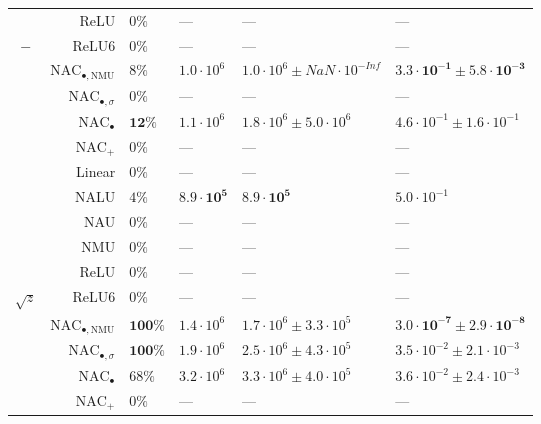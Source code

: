 \begin{longtable}{crllll}
 & ReLU & $0\%$ & --- & --- & ---\\

\multirow{-10}{*}{\centering\arraybackslash $\bm{-}$} & ReLU6 & $0\%$ & --- & --- & ---\\
\cmidrule{1-6}
 & $\mathrm{NAC}_{\bullet,\mathrm{NMU}}$ & $8\%$ & $1.0 \cdot 10^{6}$ & $1.0 \cdot 10^{6} \pm NaN \cdot 10^{-Inf}$ & $\mathbf{3.3 \cdot 10^{-1} \pm 5.8 \cdot 10^{-3}}$\\

 & $\mathrm{NAC}_{\bullet,\sigma}$ & $0\%$ & --- & --- & ---\\

 & $\mathrm{NAC}_{\bullet}$ & $\mathbf{12\%}$ & $1.1 \cdot 10^{6}$ & $1.8 \cdot 10^{6} \pm 5.0 \cdot 10^{6}$ & $4.6 \cdot 10^{-1} \pm 1.6 \cdot 10^{-1}$\\

 & $\mathrm{NAC}_{+}$ & $0\%$ & --- & --- & ---\\

 & Linear & $0\%$ & --- & --- & ---\\

 & NALU & $4\%$ & $\mathbf{8.9 \cdot 10^{5}}$ & $\mathbf{8.9 \cdot 10^{5}}$ & $5.0 \cdot 10^{-1}$\\

 & NAU & $0\%$ & --- & --- & ---\\

 & NMU & $0\%$ & --- & --- & ---\\

 & ReLU & $0\%$ & --- & --- & ---\\

\multirow{-10}{*}{\centering\arraybackslash $\sqrt{z}$} & ReLU6 & $0\%$ & --- & --- & ---\\
\cmidrule{1-6}
 & $\mathrm{NAC}_{\bullet,\mathrm{NMU}}$ & $\mathbf{100\%}$ & $1.4 \cdot 10^{6}$ & $1.7 \cdot 10^{6} \pm 3.3 \cdot 10^{5}$ & $\mathbf{3.0 \cdot 10^{-7} \pm 2.9 \cdot 10^{-8}}$\\

 & $\mathrm{NAC}_{\bullet,\sigma}$ & $\mathbf{100\%}$ & $1.9 \cdot 10^{6}$ & $2.5 \cdot 10^{6} \pm 4.3 \cdot 10^{5}$ & $3.5 \cdot 10^{-2} \pm 2.1 \cdot 10^{-3}$\\

 & $\mathrm{NAC}_{\bullet}$ & $68\%$ & $3.2 \cdot 10^{6}$ & $3.3 \cdot 10^{6} \pm 4.0 \cdot 10^{5}$ & $3.6 \cdot 10^{-2} \pm 2.4 \cdot 10^{-3}$\\

 & $\mathrm{NAC}_{+}$ & $0\%$ & --- & --- & ---\\


\end{longtable}
